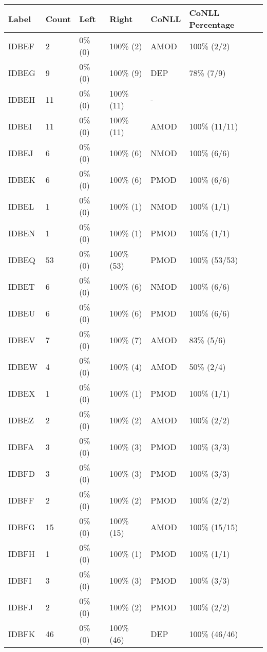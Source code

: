 \begin{figure*}
\begin{tabular}{|l|l|l|l||l|l|}
\hline
Label & Count & Left & Right & CoNLL & CoNLL Percentage\\ 
\hline
 IDBEF & 2 & 0\% (0) & 100\% (2) & AMOD & 100\% (2/2) \\ 
\hline
 IDBEG & 9 & 0\% (0) & 100\% (9) & DEP & 78\% (7/9) \\ 
\hline
 IDBEH & 11 & 0\% (0) & 100\% (11) & - &  \\ 
\hline
 IDBEI & 11 & 0\% (0) & 100\% (11) & AMOD & 100\% (11/11) \\ 
\hline
 IDBEJ & 6 & 0\% (0) & 100\% (6) & NMOD & 100\% (6/6) \\ 
\hline
 IDBEK & 6 & 0\% (0) & 100\% (6) & PMOD & 100\% (6/6) \\ 
\hline
 IDBEL & 1 & 0\% (0) & 100\% (1) & NMOD & 100\% (1/1) \\ 
\hline
 IDBEN & 1 & 0\% (0) & 100\% (1) & PMOD & 100\% (1/1) \\ 
\hline
 IDBEQ & 53 & 0\% (0) & 100\% (53) & PMOD & 100\% (53/53) \\ 
\hline
 IDBET & 6 & 0\% (0) & 100\% (6) & NMOD & 100\% (6/6) \\ 
\hline
 IDBEU & 6 & 0\% (0) & 100\% (6) & PMOD & 100\% (6/6) \\ 
\hline
 IDBEV & 7 & 0\% (0) & 100\% (7) & AMOD & 83\% (5/6) \\ 
\hline
 IDBEW & 4 & 0\% (0) & 100\% (4) & AMOD & 50\% (2/4) \\ 
\hline
 IDBEX & 1 & 0\% (0) & 100\% (1) & PMOD & 100\% (1/1) \\ 
\hline
 IDBEZ & 2 & 0\% (0) & 100\% (2) & AMOD & 100\% (2/2) \\ 
\hline
 IDBFA & 3 & 0\% (0) & 100\% (3) & PMOD & 100\% (3/3) \\ 
\hline
 IDBFD & 3 & 0\% (0) & 100\% (3) & PMOD & 100\% (3/3) \\ 
\hline
 IDBFF & 2 & 0\% (0) & 100\% (2) & PMOD & 100\% (2/2) \\ 
\hline
 IDBFG & 15 & 0\% (0) & 100\% (15) & AMOD & 100\% (15/15) \\ 
\hline
 IDBFH & 1 & 0\% (0) & 100\% (1) & PMOD & 100\% (1/1) \\ 
\hline
 IDBFI & 3 & 0\% (0) & 100\% (3) & PMOD & 100\% (3/3) \\ 
\hline
 IDBFJ & 2 & 0\% (0) & 100\% (2) & PMOD & 100\% (2/2) \\ 
\hline
 IDBFK & 46 & 0\% (0) & 100\% (46) & DEP & 100\% (46/46) \\ 

\end{tabular}
\end{figure*}
